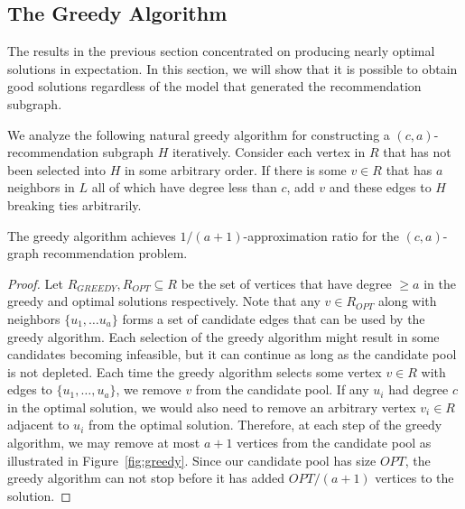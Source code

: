 \subsection{The Greedy Algorithm}
\label{greedy}
The results in the previous section concentrated on producing nearly
optimal solutions in expectation. In this section, we will show that
it is possible to obtain good solutions regardless of the model that
generated the recommendation subgraph. \vs

We analyze the following natural greedy algorithm for constructing a $(c,a)$-recommendation subgraph $H$ iteratively.
Consider each vertex in $R$ that has not been selected
into $H$ in some arbitrary order. If there is some $v \in R$ that has $a$ neighbors
in $L$ all of which have degree less than $c$, add $v$ and these edges to $H$ breaking
ties arbitrarily.

\begin{thm}
The greedy algorithm achieves $1/(a+1)$-approximation ratio for the $(c,a)$-graph
recommendation problem.
\end{thm}
\begin{proof}
Let $R_{GREEDY}, R_{OPT}\subseteq R$ be the set of vertices that have
degree $\geq a$ in the greedy and optimal solutions respectively. Note
that any $v \in R_{OPT}$ along with neighbors $\{u_1,\ldots u_a\}$
forms a set of candidate edges that can be used by the greedy
algorithm.
Each selection of the greedy algorithm might result in
some candidates becoming infeasible, but it can continue as long as the candidate pool is not depleted.
Each time the greedy algorithm selects some vertex $v\in
R$ with edges to $\{u_1,\ldots, u_a\}$, we remove $v$ from the candidate pool.
If any $u_i$ had degree $c$ in the optimal solution, we would also need to
remove an arbitrary vertex $v_i\in R$ adjacent to $u_i$ from the optimal
solution.
Therefore, at each step of
the greedy algorithm, we may remove at most $a+1$ vertices from
the candidate pool as illustrated in Figure~\ref{fig:greedy}. Since our candidate pool has size $OPT$, the
greedy algorithm can not stop before it has added $OPT/(a+1)$
vertices to the solution.
\end{proof}


